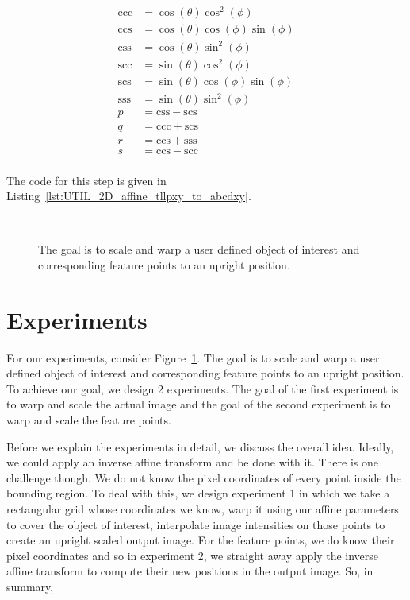\begin{equation*}
\begin{array}{llll}
\mathrm{ccc} &= \cos(\theta) \cos^2(\phi)\\
\mathrm{ccs} &= \cos(\theta) \cos(\phi) \sin(\phi)\\
\mathrm{css} &= \cos(\theta) \sin^2(\phi)\\
\mathrm{scc} &= \sin(\theta) \cos^2(\phi) \\
\mathrm{scs} &= \sin(\theta) \cos(\phi) \sin(\phi)\\
\mathrm{sss} &= \sin(\theta) \sin^2(\phi)\\
p   &=  \mathrm{css} - \mathrm{scs}\\
q   &=  \mathrm{ccc} + \mathrm{scs}\\
r   &= \mathrm{ccs} + \mathrm{sss}\\
s   &=  \mathrm{ccs} - \mathrm{scc}\\
\end{array}
\end{equation*}

The code for this step is given in Listing~\ref{lst:UTIL_2D_affine_tllpxy_to_abcdxy}.

								\begin{figure}[t]
								\centering
								\\
								\caption{The goal is to scale and warp a user defined object of interest and corresponding feature points to an upright position.}
								\label{Fig:overall}
								\end{figure}


\section{Experiments}
For our experiments, consider Figure~\ref{Fig:overall}.  The goal is to scale and warp a user defined object of interest and corresponding feature points to an upright position.  To achieve our goal, we design 2 experiments.  The goal of the first experiment is to warp and scale the actual image and the goal of the second experiment is to warp and scale the feature points.

Before we explain the experiments in detail, we discuss the overall idea.  Ideally, we could apply an inverse affine transform and be done with it.  There is one challenge though.  We do not know the pixel coordinates of every point inside the bounding region.  To deal with this, we design experiment 1 in which we take a rectangular grid whose coordinates we know, warp it using our affine parameters to cover the object of interest, interpolate image intensities on those points to create an upright scaled output image.  For the feature points, we do know their pixel coordinates and so in experiment 2, we straight away apply the inverse affine transform to compute their new positions in the output image.  So, in summary,


